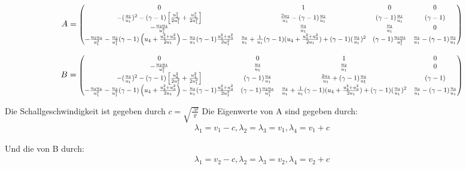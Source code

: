 \documentclass[11pt]{scrartcl}
\newcommand\scalemath[2]{\scalebox{#1}{\mbox{\ensuremath{\displaystyle #2}}}}
\begin{document}
\begin{align*}
	A=
	\scalemath{0.8}{
		\begin{pmatrix}
			0 & 1 & 0 & 0\\
			-(\frac{u_2}{u_1})^2- (\gamma -1) \left[\frac{u_2^2}{2 u_1^2}+\frac{u_3^2}{2 u_1^2}\right]    & \frac{2 u_2}{u_1} - (\gamma - 1)\frac{u_2}{u_1} &  (\gamma - 1) \frac{u_3}{u_1} & (\gamma - 1) \\
			-\frac{u_2 u_3}{u_1^2} & \frac{u_3}{u_1} & \frac{u_2}{u_1} & 0 \\
			-\frac{u_2 u_4}{u_1^2}-\frac{u_2}{u_1^2}(\gamma -1) \left(u_4+\frac{u_2^2+u_3^2}{2u_1}\right) - \frac{u_2}{u_1}(\gamma - 1) \frac{u_2^2+u_3^2}{2u_1^2} & 
			\frac{u_4}{u_1}+\frac{1}{u_1}(\gamma - 1) (u_4+ \frac{u_2^2+ u_3^2}{2 u_1}) + (\gamma - 1) (\frac{u_2}{u_1})^2
			& (\gamma - 1) \frac{u_2 u_3}{u_1^2} & \frac{u_2}{u_1} - (\gamma - 1) \frac{u_2}{u_1} 
	\end{pmatrix} }
\end{align*}

\begin{align*}
	B =
	\scalemath{0.8}{
		\begin{pmatrix}
			0 & 0 & 1 & 0\\
			-\frac{u_2 u_3}{u_1^2}  & \frac{u_3}{u_1} &   \frac{u_2}{u_1} & 0\\
			-(\frac{u_3}{u_1})^2- (\gamma -1) \left[\frac{u_2^2}{2 u_1^2}+\frac{u_3^2}{2 u_1^2}\right]  & (\gamma - 1 ) \frac{u_2}{u_1}& \frac{2 u_3}{u_1} + (\gamma - 1)\frac{u_3}{u_1} & ( \gamma - 1) \\
			-\frac{u_3  u_4}{u_1^2}-\frac{u_3}{u_1^2}(\gamma -1) \left(u_4+\frac{u_2^2+u_3^2}{2u_1}\right) - \frac{u_3}{u_1}(\gamma - 1) \frac{u_2^2+u_3^2}{2u_1^2} &  (\gamma - 1) \frac{u_2 u_3}{u_1^2}
			& \frac{u_4}{u_1}+\frac{1}{u_1}(\gamma - 1) (u_4+ \frac{u_2^2+ u_3^2}{2 u_1}) + (\gamma - 1) (\frac{u_3}{u_1})^2  & \frac{u_3}{u_1} - (\gamma - 1) \frac{u_3}{u_1} 
	\end{pmatrix} }
\end{align*}

Die Schallgeschwindigkeit ist gegeben durch $c=\sqrt{\frac{\gamma p}{\varrho}}$
Die Eigenwerte von A sind gegeben durch:
\begin{align*}
	\lambda_1=v_1 - c ,\lambda_2 = \lambda_3 = v_1 , \lambda_4 = v_1 + c
\end{align*}

Und die von B durch:
\begin{align*}
	\lambda_1=v_2- c ,\lambda_2 = \lambda_3 = v_2 , \lambda_4 = v_2 + c
\end{align*}
\end{document}
